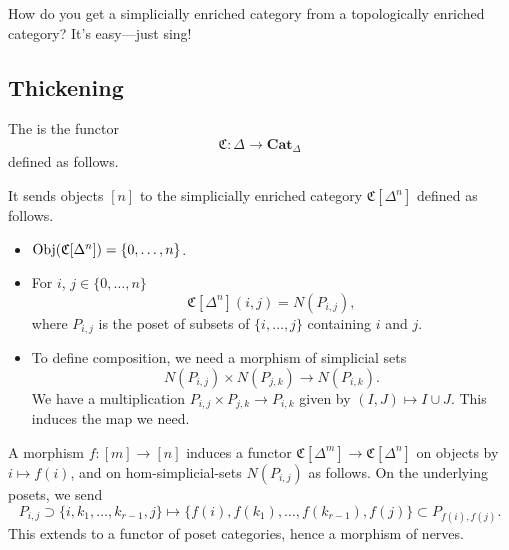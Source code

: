 \documentclass[main.tex]{subfiles}
\begin{document}
\begin{joke}
  How do you get a simplicially enriched category from a topologically enriched category? It's easy---just sing!
\end{joke}

\subsection{Thickening}
\label{ssc:thickening}

\begin{definition}[thickening]
  \label{def:thickening}
  The  is the functor
  \begin{equation*}
    \mathfrak{C}\colon \Delta \to \mathbf{Cat}_{\Delta}
  \end{equation*}
  defined as follows.

  It sends objects $[n]$ to the simplicially enriched category $\mathfrak{C}[\Delta^{n}]$ defined as follows.
  \begin{itemize}
    \item $\operatorname{Obj}(\mathfrak{C}[\Delta^{n}]) = \{0, \ldots, n\}$.

    \item For $i$, $j \in \{0, \ldots, n\}$
      \begin{equation*}
        \mathfrak{C}[\Delta^{n}](i, j) = N(P_{i, j}),
      \end{equation*}
      where $P_{i, j}$ is the poset of subsets of $\{i, \ldots, j\}$ containing $i$ and $j$.

    \item To define composition, we need a morphism of simplicial sets
      \begin{equation*}
        N(P_{i,j}) \times N(P_{j,k}) \to N(P_{i, k}).
      \end{equation*}
      We have a multiplication $P_{i,j} \times P_{j, k} \to P_{i, k}$ given by $(I, J) \mapsto I \cup J$. This induces the map we need.
  \end{itemize}

  A morphism $f\colon [m] \to [n]$ induces a functor $\mathfrak{C}[\Delta^{m}] \to \mathfrak{C}[\Delta^{n}]$ on objects by $i \mapsto f(i)$, and on hom-simplicial-sets $N(P_{i,j})$ as follows. On the underlying posets, we send
  \begin{equation*}
    P_{i,j} \supset \{ i, k_{1}, \ldots, k_{r-1}, j \} \mapsto \{f(i), f(k_{1}), \ldots, f(k_{r-1}), f(j)\} \subset P_{f(i),f(j)}.
  \end{equation*}
  This extends to a functor of poset categories, hence a morphism of nerves.
\end{definition}
\end{document}
